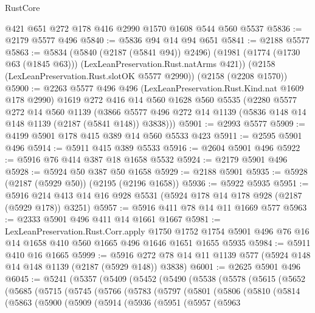 \begin{lexlean}{RustCore}
\begin{coremodule}
    @421
    @651
    @272
    @178
    @416
    @2990
    @1570
    @1608
    @544
    @560
    @5537
@5836 := @2179 @5577 @496
@5840 := @5836 @94 @14 @94 @651
@5841 := @2188 @5577
@5863 := @5834
    (@5840 (@2187 (@5841 @94)) @2496)
    (@1981 (@1774 (@1730 @63 (@1845 @63))) (LexLeanPreservation.Rust.natArms @421))
    (@2158 (LexLeanPreservation.Rust.slotOK @5577 @2990))
    (@2158 (@2208 @1570))
@5900 := @2263
    @5577
    @496
    @496
    (LexLeanPreservation.Rust.Kind.nat @1609 @178 @2990)
    @1619
    @272
    @416
    @14
    @560
    @1628
    @560
    @5535
    (@2280
      @5577
      @272
      @14
      @560
      @1139
      (@3866 @5577 @496 @272 @14 @1139 (@5836 @148 @14 @148 @1139 (@2187 (@5841 @148)) @3838)))
@5901 := @2993 @5577
@5909 := @4199 @5901 @178 @415 @389 @14 @560 @5533 @423
@5911 := @2595 @5901 @496
@5914 := @5911 @415 @389 @5533
@5916 := @2604 @5901 @496
@5922 := @5916 @76 @414 @387 @18 @1658 @5532
@5924 := @2179 @5901 @496
@5928 := @5924 @50 @387 @50 @1658
@5929 := @2188 @5901
@5935 := @5928 (@2187 (@5929 @50)) (@2195 (@2196 @1658))
@5936 := @5922 @5935
@5951 := @5916 @214 @413 @14 @16 @928 @5531 (@5924 @178 @14 @178 @928 (@2187 (@5929 @178)) @3251)
@5957 := @5916 @411 @78 @14 @11 @1669 @577
@5963 := @2333 @5901 @496 @411 @14 @1661 @1667
@5981 := LexLeanPreservation.Rust.Corr.apply
    @1750
    @1752
    @1754
    @5901
    @496
    @76
    @16
    @14
    @1658
    @410
    @560
    @1665
    @496
    @1646
    @1651
    @1655
    @5935
@5984 := @5911 @410 @16 @1665
@5999 := @5916 @272 @78 @14 @11 @1139 @577 (@5924 @148 @14 @148 @1139 (@2187 (@5929 @148)) @3838)
@6001 := @2625 @5901 @496
@6045 := @5241
    (@5357
      (@5409
        (@5452
          (@5490
            (@5538
              (@5578
                (@5615
                  (@5652
                    (@5685
                      (@5715
                        (@5745
                          (@5766
                            (@5783
                              (@5797
                                (@5801
                                  (@5806
                                    (@5810
                                      (@5814
                                        (@5863
                                          (@5900
                                            (@5909
                                              (@5914
                                                (@5936
                                                  (@5951
                                                    (@5957
                                                      (@5963

\end{coremodule}
\end{lexlean}

